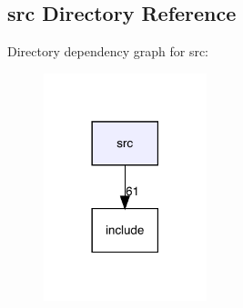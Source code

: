 \subsection{src Directory Reference}
\label{dir_68267d1309a1af8e8297ef4c3efbcdba}
Directory dependency graph for src\+:\nopagebreak
\begin{figure}[H]
\begin{center}
\leavevmode
\includegraphics[width=134pt]{dir_68267d1309a1af8e8297ef4c3efbcdba_dep}
\end{center}
\end{figure}
